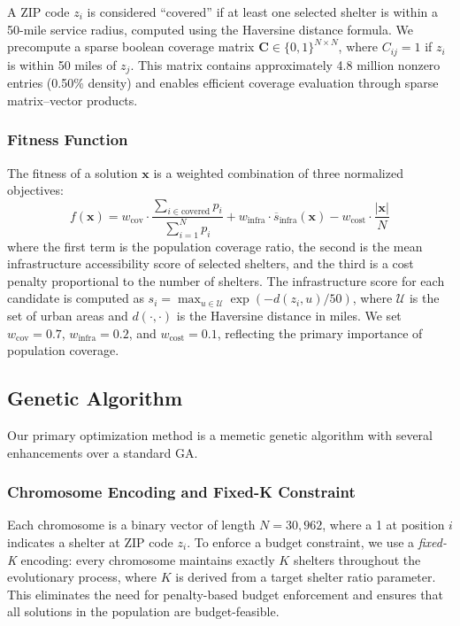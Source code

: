 \documentclass[12pt]{article}
\begin{document}
A ZIP code $z_i$ is considered ``covered'' if at least one selected shelter is within a 50-mile service radius, computed using the Haversine distance formula. We precompute a sparse boolean coverage matrix $\mathbf{C} \in \{0, 1\}^{N \times N}$, where $C_{ij} = 1$ if $z_i$ is within 50 miles of $z_j$. This matrix contains approximately 4.8 million nonzero entries (0.50\% density) and enables efficient coverage evaluation through sparse matrix--vector products.

\subsubsection{Fitness Function}

The fitness of a solution $\mathbf{x}$ is a weighted combination of three normalized objectives:
\begin{equation}
f(\mathbf{x}) = w_{\text{cov}} \cdot \frac{\sum_{i \in \text{covered}} p_i}{\sum_{i=1}^{N} p_i} + w_{\text{infra}} \cdot \overline{s}_{\text{infra}}(\mathbf{x}) - w_{\text{cost}} \cdot \frac{|\mathbf{x}|}{N}
\label{eq:fitness}
\end{equation}
where the first term is the population coverage ratio, the second is the mean infrastructure accessibility score of selected shelters, and the third is a cost penalty proportional to the number of shelters. The infrastructure score for each candidate is computed as $s_i = \max_{u \in \mathcal{U}} \exp(-d(z_i, u) / 50)$, where $\mathcal{U}$ is the set of urban areas and $d(\cdot, \cdot)$ is the Haversine distance in miles. We set $w_{\text{cov}} = 0.7$, $w_{\text{infra}} = 0.2$, and $w_{\text{cost}} = 0.1$, reflecting the primary importance of population coverage.

\subsection{Genetic Algorithm}

Our primary optimization method is a memetic genetic algorithm with several enhancements over a standard GA.

\subsubsection{Chromosome Encoding and Fixed-K Constraint}

Each chromosome is a binary vector of length $N = 30{,}962$, where a 1 at position $i$ indicates a shelter at ZIP code $z_i$. To enforce a budget constraint, we use a \textit{fixed-K} encoding: every chromosome maintains exactly $K$ shelters throughout the evolutionary process, where $K$ is derived from a target shelter ratio parameter. This eliminates the need for penalty-based budget enforcement and ensures that all solutions in the population are budget-feasible.
\end{document}
